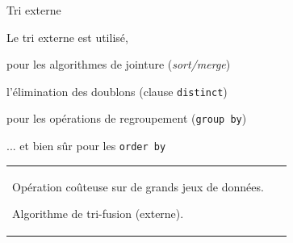 \documentclass[aspectratio=169, handout]{beamer} %
\begin{document}
\begin{frame}{Tri externe}

Le \alert{tri externe} est utilisé,

\begin{redbullet}
  \item pour les algorithmes de jointure (\textit{sort/merge})

   \item l'élimination des doublons (clause \texttt{distinct})

    \item pour les opérations de regroupement (\texttt{group by})

   \item ... et bien sûr pour les \texttt{order by}
\end{redbullet}

\vfill

\begin{tabular}{p{9cm}p{5cm}}
Opération  coûteuse
sur de grands jeux de données.

\bigskip

Algorithme de \alert{tri-fusion} (externe).
&
~
\end{tabular}


\end{frame}
\end{document}
